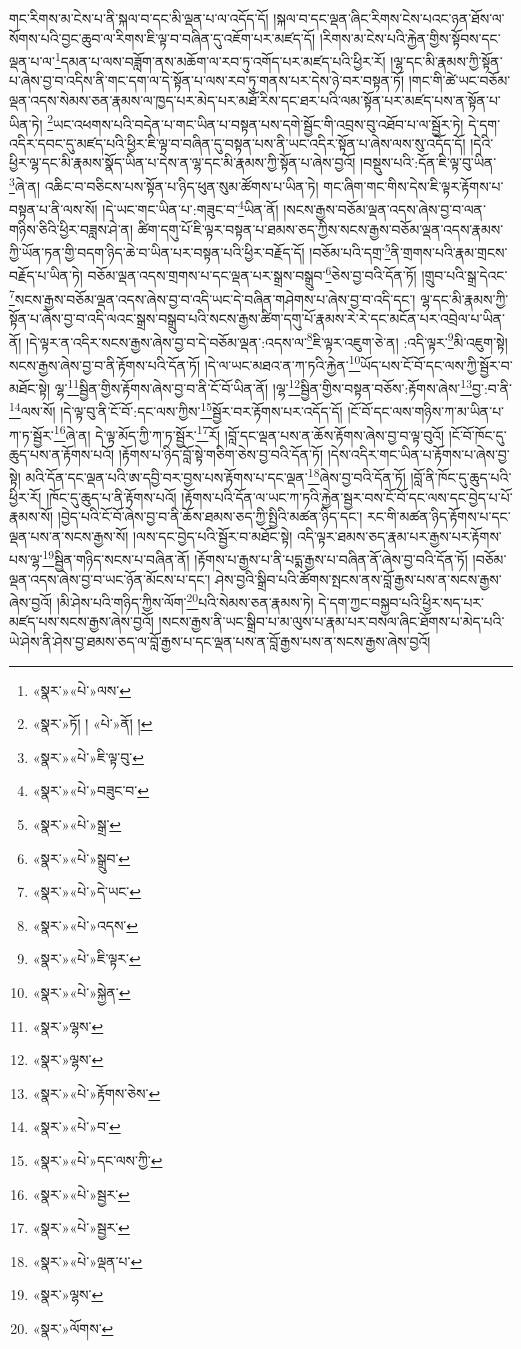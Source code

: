 གང་རིགས་མ་ངེས་པ་ནི་སྐལ་བ་དང་མི་ལྡན་པ་ལ་འདོད་དོ། །སྐལ་བ་དང་ལྡན་ཞིང་རིགས་ངེས་པའང་ཉན་ཐོས་ལ་སོགས་པའི་བྱང་ཆུབ་ལ་རིགས་ཇི་ལྟ་བ་བཞིན་དུ་འཇོག་པར་མཛད་དོ། །རིགས་མ་ངེས་པའི་རྐྱེན་གྱིས་སྟོབས་དང་ལྡན་པ་ལ་\footnote{«སྣར་»«པེ་»ལས་}དམན་པ་ལས་བཟློག་ནས་མཆོག་ལ་རབ་ཏུ་འགོད་པར་མཛད་པའི་ཕྱིར་རོ། །ལྷ་དང་མི་རྣམས་ཀྱི་སྟོན་པ་ཞེས་བྱ་བ་འདིས་ནི་གང་དག་ལ་དེ་སྟོན་པ་ལས་རབ་ཏུ་གནས་པར་དེས་ཉེ་བར་བསྟན་ཏོ། །གང་གི་ཚེ་ཡང་བཅོམ་ལྡན་འདས་སེམས་ཅན་རྣམས་ལ་ཁྱད་པར་མེད་པར་མཐོ་རིས་དང་ཐར་པའི་ལམ་སྟོན་པར་མཛད་པས་ན་སྟོན་པ་ཡིན་ཏེ། \footnote{«སྣར་»ཏོ། ། «པེ་»ནོ། ། }ཡང་འཕགས་པའི་བདེན་པ་གང་ཡིན་པ་བསྟན་པས་དགེ་སྦྱོང་གི་འབྲས་བུ་འཐོབ་པ་ལ་སྦྱོར་ཏེ། དེ་དག་འདིར་དབང་དུ་མཛད་པའི་ཕྱིར་ཇི་ལྟ་བ་བཞིན་དུ་བསྟན་པས་ནི་ཡང་འདིར་སྟོན་པ་ཞེས་ལས་སུ་འདོད་དོ། །དེའི་ཕྱིར་ལྷ་དང་མི་རྣམས་སྣོད་ཡིན་པ་དེས་ན་ལྷ་དང་མི་རྣམས་ཀྱི་སྟོན་པ་ཞེས་བྱའོ། །བསྡུས་པའི་:དོན་ཇི་ལྟ་བུ་ཡིན་\footnote{«སྣར་»«པེ་»ཇི་ལྟ་བུ་}ཞེ་ན། འཆིང་བ་བཅིངས་པས་སྟོན་པ་ཉིད་ཕུན་སུམ་ཚོགས་པ་ཡིན་ཏེ། གང་ཞིག་གང་གིས་དེས་ཇི་ལྟར་རྟོགས་པ་བསྟན་པ་ནི་ལས་སོ། །དེ་ཡང་གང་ཡིན་པ་:གཟུང་བ་\footnote{«སྣར་»«པེ་»བཟུང་བ་}ཡིན་ནོ། །སངས་རྒྱས་བཅོམ་ལྡན་འདས་ཞེས་བྱ་བ་ལན་གཉིས་ཅིའི་ཕྱིར་བཟླས་ཤེ་ན། ཚིག་དགུ་པོ་ཇི་ལྟར་བསྟན་པ་ཐམས་ཅད་ཀྱིས་སངས་རྒྱས་བཅོམ་ལྡན་འདས་རྣམས་ཀྱི་ཡོན་ཏན་གྱི་བདག་ཉིད་ཆེ་བ་ཡིན་པར་བསྟན་པའི་ཕྱིར་བརྗོད་དོ། །བཅོམ་པའི་དགྲ་\footnote{«སྣར་»«པེ་»སྒྲ་}ནི་གྲགས་པའི་རྣམ་གྲངས་བརྗོད་པ་ཡིན་ཏེ། བཅོམ་ལྡན་འདས་གྲགས་པ་དང་ལྡན་པར་སྒྲས་བསྒྲུབ་\footnote{«སྣར་»«པེ་»སྒྲུབ་}ཅེས་བྱ་བའི་དོན་ཏོ། །གྲུབ་པའི་སྒྲ་དེའང་\footnote{«སྣར་»«པེ་»དེ་ཡང་}སངས་རྒྱས་བཅོམ་ལྡན་འདས་ཞེས་བྱ་བ་འདི་ཡང་དེ་བཞིན་གཤེགས་པ་ཞེས་བྱ་བ་འདི་དང་། ལྷ་དང་མི་རྣམས་ཀྱི་སྟོན་པ་ཞེས་བྱ་བ་འདི་ལའང་སྒྲས་བསྒྲུབ་པའི་སངས་རྒྱས་ཚིག་དགུ་པོ་རྣམས་རེ་རེ་དང་མངོན་པར་འབྲེལ་པ་ཡིན་ནོ། །དེ་ལྟར་ན་འདིར་སངས་རྒྱས་ཞེས་བྱ་བ་དེ་བཅོམ་ལྡན་:འདས་ལ་\footnote{«སྣར་»«པེ་»འདས་}ཇི་ལྟར་འཇུག་ཅེ་ན། :འདི་ལྟར་\footnote{«སྣར་»«པེ་»ཇི་ལྟར་}མི་འཇུག་སྟེ། སངས་རྒྱས་ཞེས་བྱ་བ་ནི་རྟོགས་པའི་དོན་ཏོ། །དེ་ལ་ཡང་མཐའ་ན་ཀ་ཏའི་རྐྱེན་\footnote{«སྣར་»«པེ་»སྐྱེན་}ཡོད་པས་ངོ་བོ་དང་ལས་ཀྱི་སྦྱོར་བ་མཐོང་སྟེ། ལྷ་\footnote{«སྣར་»ལྷས་}སྦྱིན་གྱིས་རྟོགས་ཞེས་བྱ་བ་ནི་ངོ་བོ་ཡིན་ནོ། །ལྷ་\footnote{«སྣར་»ལྷས་}སྦྱིན་གྱིས་བསྟན་བཅོས་:རྟོགས་ཞེས་\footnote{«སྣར་»«པེ་»རྟོགས་ཅེས་}བྱ་:བ་ནི་\footnote{«སྣར་»«པེ་»བ་}ལས་སོ། །དེ་ལྟ་བུ་ནི་ངོ་བོ་:དང་ལས་ཀྱིས་\footnote{«སྣར་»«པེ་»དང་ལས་ཀྱི་}སྦྱོར་བར་རྟོགས་པར་འདོད་དོ། །ངོ་བོ་དང་ལས་གཉིས་ཀ་མ་ཡིན་པ་ཀ་ཏ་སྦྱོར་\footnote{«སྣར་»«པེ་»སྦྱར་}ཞེ་ན། དེ་ལྟ་མོད་ཀྱི་ཀ་ཏ་སྦྱོར་\footnote{«སྣར་»«པེ་»སྦྱར་}རོ། །བློ་དང་ལྡན་པས་ན་ཆོས་རྟོགས་ཞེས་བྱ་བ་ལྟ་བུའོ། །ངོ་བོ་ཁོང་དུ་ཆུད་པས་ན་རྟོགས་པའོ། །རྟོགས་པ་ཉིད་བློ་སྟེ་གཅིག་ཅེས་བྱ་བའི་དོན་ཏོ། །དེས་འདིར་གང་ཡིན་པ་རྟོགས་པ་ཞེས་བྱ་སྟེ། མའི་དོན་དང་ལྡན་པའི་ཨ་དབྱི་བར་བྱས་པས་རྟོགས་པ་དང་ལྡན་\footnote{«སྣར་»«པེ་»ལྡན་པ་}ཞེས་བྱ་བའི་དོན་ཏོ། །བློ་ནི་ཁོང་དུ་ཆུད་པའི་ཕྱིར་རོ། །ཁོང་དུ་ཆུད་པ་ནི་རྟོགས་པའོ། །རྟོགས་པའི་དོན་ལ་ཡང་ཀ་ཏའི་རྐྱེན་སྦྱར་བས་ངོ་བོ་དང་ལས་དང་བྱེད་པ་པོ་རྣམས་སོ། །བྱེད་པའི་ངོ་བོ་ཞེས་བྱ་བ་ནི་ཆོས་ཐམས་ཅད་ཀྱི་སྤྱིའི་མཚན་ཉིད་དང་། རང་གི་མཚན་ཉིད་རྟོགས་པ་དང་ལྡན་པས་ན་སངས་རྒྱས་སོ། །ལས་དང་བྱེད་པའི་སྦྱོར་བ་མཐོང་སྟེ། འདི་ལྟར་ཐམས་ཅད་རྣམ་པར་རྒྱས་པར་རྟོགས་པས་ལྷ་\footnote{«སྣར་»ལྷས་}སྦྱིན་གཉིད་སངས་པ་བཞིན་ནོ། །རྟོགས་པ་རྒྱས་པ་ནི་པདྨ་རྒྱས་པ་བཞིན་ནོ་ཞེས་བྱ་བའི་དོན་ཏོ། །བཅོམ་ལྡན་འདས་ཞེས་བྱ་བ་ཡང་ཉོན་མོངས་པ་དང་། ཤེས་བྱའི་སྒྲིབ་པའི་ཚོགས་སྤངས་ནས་བློ་རྒྱས་པས་ན་སངས་རྒྱས་ཞེས་བྱའོ། །མི་ཤེས་པའི་གཉིད་ཀྱིས་ལོག་\footnote{«སྣར་»ལོགས་}པའི་སེམས་ཅན་རྣམས་ཏེ། དེ་དག་ཀྱང་བསྐྱབ་པའི་ཕྱིར་སད་པར་མཛད་པས་སངས་རྒྱས་ཞེས་བྱའོ། །སངས་རྒྱས་ནི་ཡང་སྒྲིབ་པ་མ་ལུས་པ་རྣམ་པར་བསལ་ཞིང་ཐོགས་པ་མེད་པའི་ཡེ་ཤེས་ནི་ཤེས་བྱ་ཐམས་ཅད་ལ་བློ་རྒྱས་པ་དང་ལྡན་པས་ན་བློ་རྒྱས་པས་ན་སངས་རྒྱས་ཞེས་བྱའོ། 